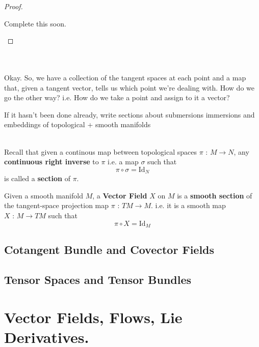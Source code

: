 \documentclass[11pt]{article}
\begin{document}
\begin{proof}
  \begin{note}
    {Complete this soon.}
  \end{note}
\end{proof}
\\
\\
Okay. So, we have a collection of the tangent spaces at each point and a map that, given a tangent vector, tells us which point we're dealing with. How do we go the other way? i.e. How do we take a point and assign to it a vector? 
\\
\begin{dottedbox}
  \begin{note}
    {If it hasn't been done already, write sections about submersions immersions and embeddings of topological + smooth manifolds}
  \end{note}
  \\
  Recall that given a continous map between topological spaces $\pi \text{ : } M \rightarrow N$, any \textbf{continuous right inverse} to $\pi$ i.e. a map $\sigma$ such that 
  \[ \pi \circ \sigma = \mathrm{Id}_{N} \]
  is called a \textbf{section} of $\pi$.
\end{dottedbox}

\begin{redbox}
  Given a smooth manifold $M$, a \textbf{Vector Field} $X$ on $M$ is a \textbf{smooth section} of the tangent-space projection map $\pi \text{ : } TM \rightarrow M$. i.e. it is a smooth map $X \text{ : } M \rightarrow TM$ such that 
  \[ \pi \circ X = \mathrm{Id}_{M} \]  
\end{redbox}

\subsection{Cotangent Bundle and Covector Fields}


\subsection{Tensor Spaces and Tensor Bundles}



\newpage
\section{Vector Fields, Flows, Lie Derivatives.}
\end{document}
